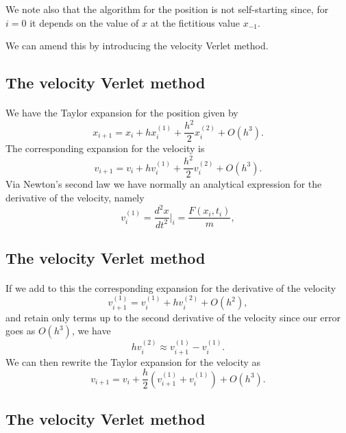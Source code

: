 \documentclass[%
oneside,                 %
final,                   %
10pt]{article}
\begin{document}
We note also that the algorithm for the position is not self-starting since, for $i=0$ it depends on the value of $x$ 
at the fictitious value $x_{-1}$. 

We can amend this by introducing the velocity Verlet method.

 

\subsection{The velocity Verlet method}

\paragraph{}
We have the Taylor expansion for the position given by
\[
x_{i+1} = x_i+hx^{(1)}_i+\frac{h^2}{2}x^{(2)}_i+O(h^3).
\]
The corresponding expansion for the velocity is 
\[
v_{i+1} = v_i+hv^{(1)}_i+\frac{h^2}{2}v^{(2)}_i+O(h^3).
\]
Via Newton's second law we have normally an analytical expression for the derivative of the velocity, namely
\[
v^{(1)}_i = \frac{d^2 x}{dt^2}\vert_{i}= \frac{F(x_i,t_i)}{m},
\]




\subsection{The velocity Verlet method}

\paragraph{}
If we add to this the corresponding expansion for the derivative of the velocity 
\[
v^{(1)}_{i+1} = v^{(1)}_i+hv^{(2)}_i+O(h^2), 
\]
and retain only terms up to the second derivative of the velocity since our error goes as $O(h^3)$, we have
\[
hv^{(2)}_i\approx v^{(1)}_{i+1}-v^{(1)}_i.
\]
We can then rewrite the Taylor expansion for the velocity as  
\[
v_{i+1} = v_i+\frac{h}{2}\left( v^{(1)}_{i+1}+v^{(1)}_{i}\right)+O(h^3).
\]





\subsection{The velocity Verlet method}
\end{document}
